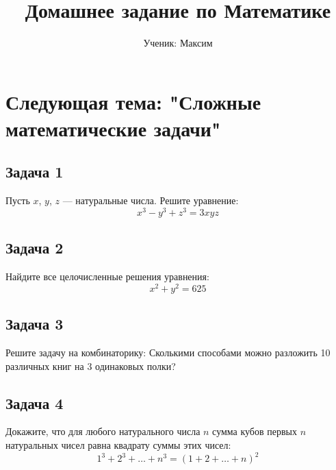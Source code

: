 \documentclass{article}
\begin{document}
\title{Домашнее задание по Математике}
\author{Ученик: Максим}
\date{}
\maketitle

\section*{Следующая тема: "Сложные математические задачи"}

\subsection*{Задача 1}
Пусть $x$, $y$, $z$ — натуральные числа. Решите уравнение:
\[
x^3 - y^3 + z^3 = 3xyz
\]

\subsection*{Задача 2}
Найдите все целочисленные решения уравнения:
\[
x^2 + y^2 = 625
\]

\subsection*{Задача 3}
Решите задачу на комбинаторику:
Сколькими способами можно разложить 10 различных книг на 3 одинаковых полки?

\subsection*{Задача 4}
Докажите, что для любого натурального числа $n$ сумма кубов первых $n$ натуральных чисел равна квадрату суммы этих чисел:
\[
1^3 + 2^3 + \ldots + n^3 = (1 + 2 + \ldots + n)^2
\]
\end{document}
